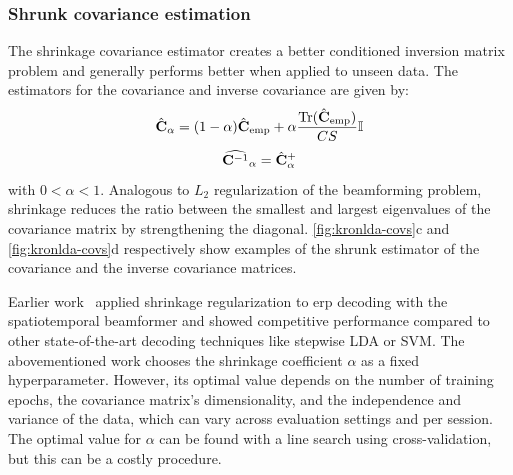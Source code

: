 	\subsubsection{Shrunk covariance estimation}
	\label{sec:stbf-struct/methods/shrunk-cov}
	The shrinkage covariance estimator creates a better conditioned inversion matrix problem and generally performs better when applied to unseen data.
	The estimators for the covariance and inverse covariance are given by:
	\begin{equation}
    \hat{\mathbf{C}}_\alpha =
    (1-\alpha) \hat{\mathbf{C}}_\text{emp}
    + \alpha\frac{\text{Tr}(\hat{\mathbf{C}}_\text{emp})}{CS}\mathbb{I}
		\label{eq:shrinkage}
	\end{equation}
	\begin{equation}
    \widehat{\mathbf{C}^{-1}}_\alpha =
    \hat{\mathbf{C}}^+_\alpha
		\label{eq:stbf-struct/shrinkage-inv}
	\end{equation}
	with $0<\alpha<1$.
	Analogous to $L_2$ regularization of the beamforming problem,
	shrinkage reduces the ratio between the smallest and largest eigenvalues
	of the covariance matrix by strengthening the diagonal.
	\cref{fig:kronlda-covs}c and \cref{fig:kronlda-covs}d respectively show examples of the
	shrunk estimator of the covariance and the inverse covariance matrices.

	Earlier work~\cite{Libert2021} applied shrinkage regularization to \ac{erp}
	decoding with the spatiotemporal beamformer and showed competitive performance
	compared to other state-of-the-art decoding techniques like stepwise LDA or SVM.
	The abovementioned work chooses the shrinkage coefficient $\alpha$ as a fixed hyperparameter.
	However, its optimal value depends on the number of training epochs, the
	covariance matrix's dimensionality, and the independence and variance of the
	data, which can vary across evaluation settings and per session.
	The optimal value for $\alpha$ can be found with a line search using cross-validation, but this can be a costly procedure.

